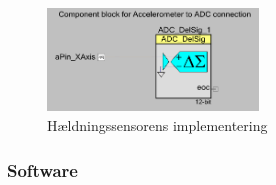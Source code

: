 \begin{figure}[htbp]
	\centering
	\includegraphics[width=0.50\textwidth]{billeder/levelsensor}
	\caption{Hældningssensorens implementering}
	\label{fig:levelsensor}
\end{figure}
\subsubsection{Software}